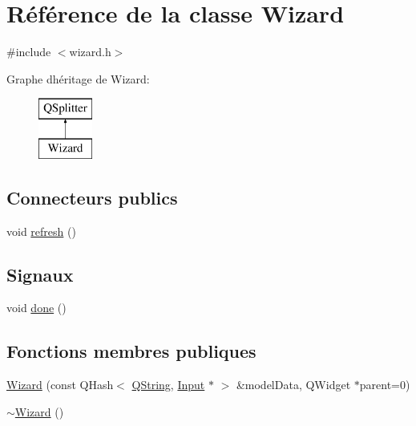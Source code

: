 \hypertarget{class_wizard}{}\section{Référence de la classe Wizard}
\label{class_wizard}


{\ttfamily \#include $<$wizard.\+h$>$}

Graphe d\textquotesingle{}héritage de Wizard\+:\begin{figure}[H]
\begin{center}
\leavevmode
\includegraphics[height=2.000000cm]{class_wizard}
\end{center}
\end{figure}
\subsection*{Connecteurs publics}
\begin{DoxyCompactItemize}
\item 
void \hyperlink{class_wizard_a86f0229c11eb822aed9a927dbbbc8bd8}{refresh} ()
\end{DoxyCompactItemize}
\subsection*{Signaux}
\begin{DoxyCompactItemize}
\item 
void \hyperlink{class_wizard_a5c87bd4bb38d19171ab2fbde096cb78b}{done} ()
\end{DoxyCompactItemize}
\subsection*{Fonctions membres publiques}
\begin{DoxyCompactItemize}
\item 
\hyperlink{class_wizard_a76ce3a0acb56d30f695b7183941563bc}{Wizard} (const Q\+Hash$<$ \hyperlink{class_q_string}{Q\+String}, \hyperlink{class_input}{Input} $\ast$ $>$ \&model\+Data, Q\+Widget $\ast$parent=0)
\item 
\hyperlink{class_wizard_a47a95421149eafa9d922883753c4f6c2}{$\sim$\+Wizard} ()
\end{DoxyCompactItemize}


